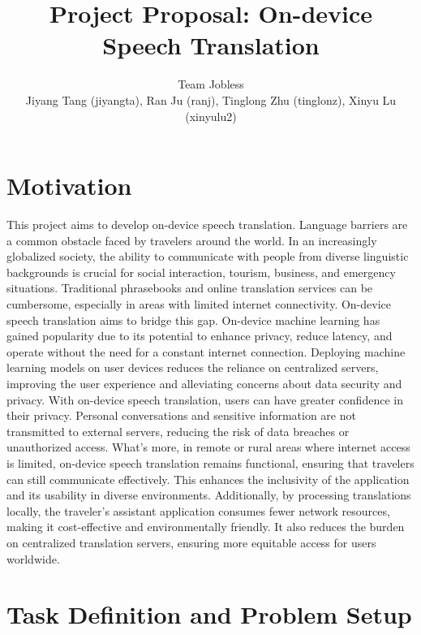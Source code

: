 \documentclass[11pt]{article}
\title{Project Proposal: On-device Speech Translation}
\author{
  Team Jobless\\
  Jiyang Tang (jiyangta), Ran Ju (ranj), Tinglong Zhu (tinglonz), Xinyu Lu (xinyulu2)\\
}
\begin{document}
\maketitle




\section{Motivation}

This project aims to develop on-device speech translation. Language barriers are a common obstacle faced by travelers around the world. In an increasingly globalized society, the ability to communicate with people from diverse linguistic backgrounds is crucial for social interaction, tourism, business, and emergency situations. Traditional phrasebooks and online translation services can be cumbersome, especially in areas with limited internet connectivity. 
On-device speech translation aims to bridge this gap. On-device machine learning has gained popularity due to its potential to enhance privacy, reduce latency, and operate without the need for a constant internet connection. Deploying machine learning models on user devices reduces the reliance on centralized servers, improving the user experience and alleviating concerns about data security and privacy. With on-device speech translation, users can have greater confidence in their privacy. Personal conversations and sensitive information are not transmitted to external servers, reducing the risk of data breaches or unauthorized access. What’s more, in remote or rural areas where internet access is limited, on-device speech translation remains functional, ensuring that travelers can still communicate effectively. This enhances the inclusivity of the application and its usability in diverse environments. Additionally, by processing translations locally, the traveler's assistant application consumes fewer network resources, making it cost-effective and environmentally friendly. It also reduces the burden on centralized translation servers, ensuring more equitable access for users worldwide.







\section{Task Definition and Problem Setup}
\end{document}
